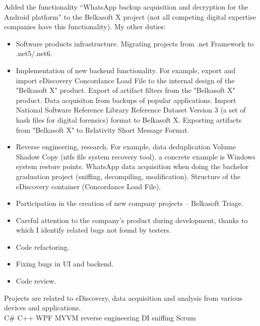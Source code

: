 \documentclass[
	a4paper,
]{fortysecondscv}
\begin{document}
\par
\makefrontsidebar{}

\begin{cvtable}[1.5]
    {
    Added the functionality “WhatsApp backup acquisition and decryption for the Android platform” to the Belkasoft X project (not all competing digital expertise companies have this functionality). My other duties:
    \begin{itemize}
        \item Software products infrastructure. Migrating projects from .net Framework to .net5/.net6.
        \item Implementation of new backend functionality. For example, export and import eDiscovery Concordance Load File to the internal design of the "Belkasoft X" product. Export of artifact filters from the "Belkasoft X" product. Data acquisiton from backups of popular applications. Import National Software Reference Library Reference Dataset Version 3 (a set of hash files for digital forensics) format to Belkasoft X. Exporting artifacts from "Belkasoft X" to Relativity Short Message Format.
        \item Reverse engineering, research. For example, data deduplication Volume Shadow Copy (ntfs file system recovery tool), a concrete example is Windows system restore points. WhatsApp data acquisition when doing the bachelor graduation project (sniffing, decompiling, modification). Structure of the eDiscovery container (Concordance Load File).
        \item Participation in the creation of new company projects -- Belkasoft Triage.
        \item Careful attention to the company's product during development, thanks to which I identify related bugs not found by testers.
        \item Code refactoring.
        \item Fixing bugs in UI and backend.
        \item Code review.
    \end{itemize}
    Projects are related to eDiscovery, data acquisition and analysis from various devices and applications.
    \\ \colorbox{cvsidecolor}{C\#}
    \colorbox{cvsidecolor}{C++}
    \colorbox{cvsidecolor}{WPF}
    \colorbox{cvsidecolor}{MVVM}
    \colorbox{cvsidecolor}{reverse engineering}
    \colorbox{cvsidecolor}{DI}
    \colorbox{cvsidecolor}{sniffing}
    \colorbox{cvsidecolor}{Scrum}
    }
    

\end{cvtable}
\end{document}
